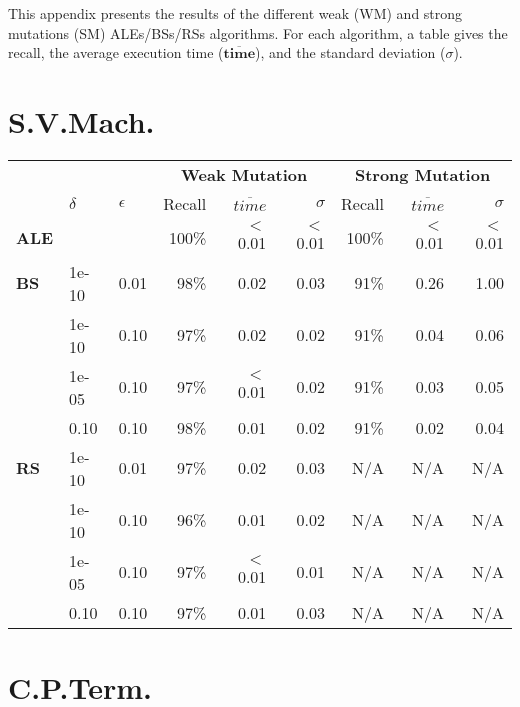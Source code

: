 
This appendix presents the results of the different weak (\gls{WM}) and strong mutations (\gls{SM}) \glspl{ALE}/\glspl{BS}/\glspl{RS} algorithms. For each algorithm, a table gives the recall, the average execution time ($\overline{\mathbf{time}}$), and the standard deviation ($\sigma$).

\section{S.V.Mach.}

\begin{small} 
\begin{tabular}{lll|r|r|r|r|r|r} 
 & & & \multicolumn{3}{c|}{\textbf{Weak Mutation}} & \multicolumn{3}{c}{\textbf{Strong Mutation}}\\ 
 & $\delta$ & $\epsilon$ & Recall & $\overline{time}$ & $\sigma$ & Recall & $\overline{time}$ & $\sigma$ \\  
\hline 
\textbf{ALE} & & & 100\% & $<$0.01  & $<$0.01  & 100\% & $<$0.01  & $<$0.01  \\ 
\textbf{BS}  & 1e-10  & 0.01  & 98\% & 0.02  & 0.03  & 91\% & 0.26  & 1.00\\
 & 1e-10  & 0.10  & 97\% & 0.02  & 0.02  & 91\% & 0.04  & 0.06\\
 & 1e-05  & 0.10  & 97\% & $<$0.01  & 0.02  & 91\% & 0.03  & 0.05\\
 & 0.10  & 0.10  & 98\% & 0.01  & 0.02  & 91\% & 0.02  & 0.04\\
\textbf{RS}  & 1e-10  & 0.01  & 97\% & 0.02  & 0.03 & N/A & N/A & N/A \\
 & 1e-10  & 0.10  & 96\% & 0.01  & 0.02 & N/A & N/A & N/A \\
 & 1e-05  & 0.10  & 97\% & $<$0.01  & 0.01 & N/A & N/A & N/A \\
 & 0.10  & 0.10  & 97\% & 0.01  & 0.03 & N/A & N/A & N/A \\
\end{tabular} 
\end{small} 


\section{C.P.Term.}

